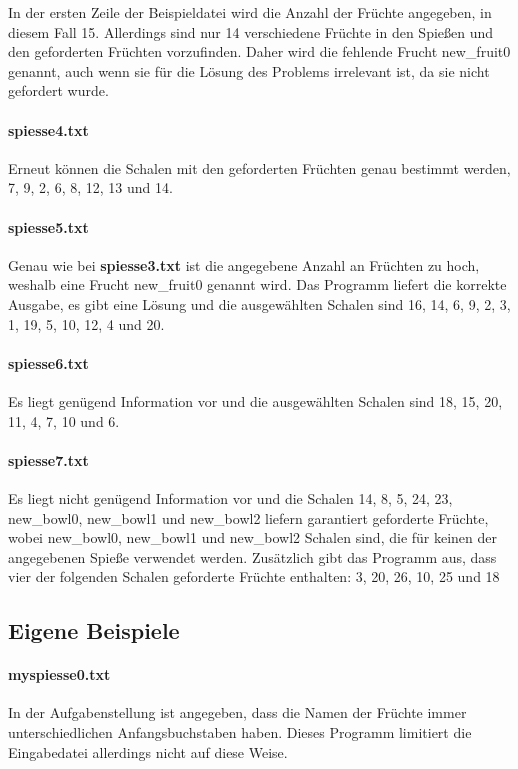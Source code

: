 \documentclass[a4paper,10pt,ngerman]{scrartcl}
\begin{document}
In der ersten Zeile der Beispieldatei wird die Anzahl der Früchte angegeben, in diesem Fall 15.
Allerdings sind nur 14 verschiedene Früchte in den Spießen und den geforderten Früchten vorzufinden.
Daher wird die fehlende Frucht new\_fruit0 genannt, auch wenn sie für die Lösung des Problems irrelevant ist, da sie nicht gefordert wurde.

\paragraph{spiesse4.txt}
Erneut können die Schalen mit den geforderten Früchten genau bestimmt werden, 7, 9, 2, 6, 8, 12, 13 und 14.

\paragraph{spiesse5.txt}
Genau wie bei \textbf{spiesse3.txt} ist die angegebene Anzahl an Früchten zu hoch, weshalb eine Frucht new\_fruit0 genannt wird.
Das Programm liefert die korrekte Ausgabe, es gibt eine Lösung und die ausgewählten Schalen sind 16, 14, 6, 9, 2, 3, 1, 19, 5, 10, 12, 4 und 20.

\paragraph{spiesse6.txt}
Es liegt genügend Information vor und die ausgewählten Schalen sind 18, 15, 20, 11, 4, 7, 10 und 6.

\paragraph{spiesse7.txt}
Es liegt nicht genügend Information vor und die Schalen 14, 8, 5, 24, 23, new\_bowl0, new\_bowl1 und new\_bowl2 liefern garantiert geforderte Früchte, wobei new\_bowl0, new\_bowl1 und new\_bowl2 Schalen sind, die für keinen der angegebenen Spieße verwendet werden.
Zusätzlich gibt das Programm aus, dass vier der folgenden Schalen geforderte Früchte enthalten: 3, 20, 26, 10, 25 und 18

\subsection{Eigene Beispiele}

\paragraph{myspiesse0.txt}
In der Aufgabenstellung ist angegeben, dass die Namen der Früchte immer unterschiedlichen Anfangsbuchstaben haben.
Dieses Programm limitiert die Eingabedatei allerdings nicht auf diese Weise.
\end{document}
